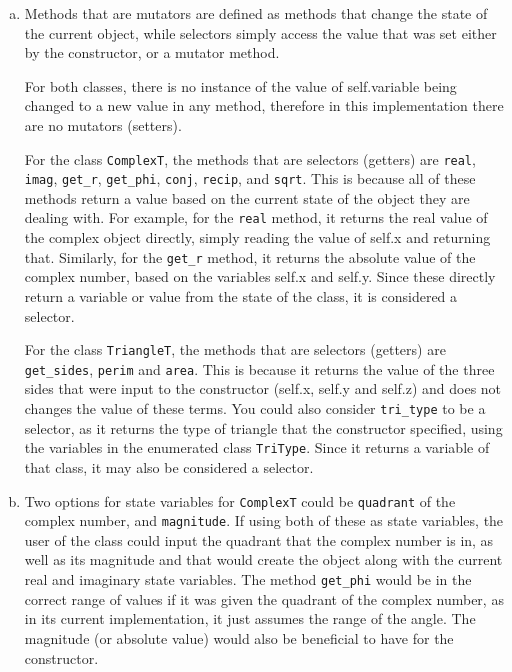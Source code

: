 \documentclass[12pt]{article}
\begin{document}
\begin{enumerate}[(a)]

\item Methods that are mutators are defined as methods that change the state 
of the current object, while selectors simply access the value that was set 
either by the constructor, or a mutator method. 

For both classes, there is no instance of the value of self.variable being 
changed to a new value in any method, therefore in this implementation there 
are no mutators (setters).

For the class \verb|ComplexT|, the methods that are selectors (getters) are 
\verb|real|, \verb|imag|, \verb|get_r|, \verb|get_phi|, \verb|conj|, \verb|recip|, 
and \verb|sqrt|. This is because all of these methods return a value based on the 
current state of the object they are dealing with. For example, for the 
\verb|real| method, it returns the real value of the complex object directly, 
simply reading the value of self.x and returning that. Similarly, for the 
\verb|get_r| method, it returns the absolute value of the complex number, based 
on the variables self.x and self.y. Since these directly return a variable or 
value from the state of the class, it is considered a selector. 

For the class \verb|TriangleT|, the methods that are selectors (getters) are 
\verb|get_sides|, \verb|perim| and \verb|area|. This is because it returns the 
value of the three sides that were input to the constructor (self.x, self.y 
and self.z) and does not changes the value of these terms. You could also consider
 \verb|tri_type| to be a selector, as it returns the type of triangle that the 
 constructor specified, using the variables in the enumerated class \verb|TriType|. 
 Since it returns a variable of that class, it may also be considered a selector. 

\item Two options for state variables for \verb|ComplexT| could be \verb|quadrant| 
of the complex number, and \verb|magnitude|. If using both of these as state 
variables, the user of the class could input the quadrant that the complex number 
is in, as well as its magnitude and that would create the object along with the 
current real and imaginary state variables. The method \verb|get_phi| would be in 
the correct range of values if it was given the quadrant of the complex number, as 
in its current implementation, it just assumes the range of the angle. The magnitude 
(or absolute value) would also be beneficial to have for the constructor. 


\end{enumerate}
\end{document}
